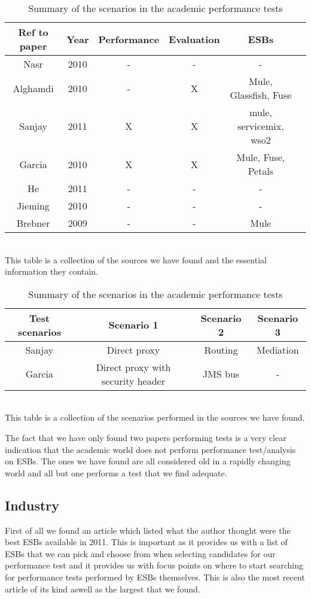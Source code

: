\begin{table}
	\caption{Summary of academic papers and what test they perform}
	\begin{tabular}{| c | c | c | c | c | c |}
		\hline
		Ref to paper & Year & Performance & Evaluation & ESBs \\ 
		\hline	
		Nasr \cite{Nasr2010} & 2010 & - & - & - \\ 
		\hline
		Alghamdi \cite{Alghamdi2010} & 2010 & - & X & Mule, Glassfish, Fuse\\
		\hline
		Sanjay \cite{Sanjay2011} & 2011 & X & X & mule, servicemix, wso2 \\ 
		\hline
		Garcia \cite{Garcia2010} & 2010 & X & X & Mule, Fuse, Petals \\
		\hline
		He \cite{HeIntegration} & 2011 & - & - & -\\
		\hline
		Jieming \cite{Jieming2010} & 2010 & - & - & - \\
		\hline
		Brebner \cite{Brebner2009} & 2009 & - & - & Mule \\
		\hline
	\end{tabular}
	\\
	This table is a collection of the sources we have found and the essential information they contain.

	\caption{Summary of the scenarios in the academic performance tests}
	\begin{tabular}{| c | c | c | c |}
		\hline
		Test scenarios & Scenario 1 & Scenario 2 & Scenario 3 \\
		\hline	
		Sanjay \cite{Sanjay2011} & Direct proxy & Routing & Mediation \\ 
		\hline	
		Garcia \cite{Garcia2010} & Direct proxy with security header & JMS bus & - \\ 
		\hline	
	\end{tabular}
	\\
	This table is a collection of the scenarios performed in the sources we have found.
\end{table}

The fact that we have only found two papers performing tests is a very clear indication that the academic world does not perform performance test/analysis on ESBs. The ones we have found are all considered old in a rapidly changing world and all but one performs a test that we find adequate.


\subsection{Industry}
First of all we found an article \cite{mehta11} which listed what the author thought were the best ESBs available in 2011. This is important as it provides us with a list of ESBs that we can pick and choose from when selecting candidates for our performance test and it provides us with focus points on where to start searching for performance tests performed by ESBs themselves. This is also the most recent article of its kind aswell as the largest that we found.


